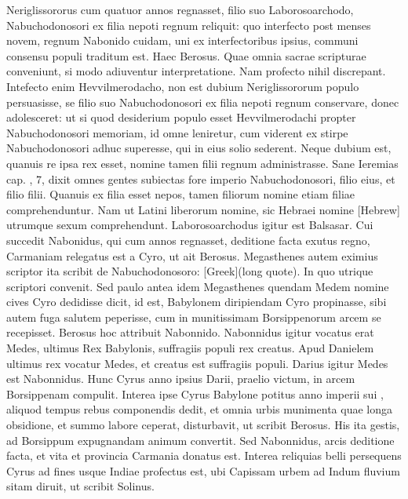 Neriglissororus cum quatuor annos regnasset,
filio suo Laborosoarchodo, Nabuchodonosori ex filia nepoti
regnum reliquit: quo interfecto post menses novem, regnum Nabonido
cuidam, uni ex interfectoribus ipsius, communi consensu
populi traditum est.
Haec Berosus.
Quae omnia sacrae scripturae conveniunt,
si modo adiuventur interpretatione.
Nam profecto nihil
discrepant.
Intefecto enim Hevvilmerodacho, non est dubium
Neriglissororum populo persuasisse, se filio suo Nabuchodonosori
ex filia nepoti regnum conservare, donec adolesceret: ut si quod
desiderium populo esset Hevvilmerodachi propter Nabuchodonosori
memoriam, id omne leniretur, cum viderent ex stirpe Nabuchodonosori
adhuc superesse, qui in eius solio sederent.
Neque dubium est, quanuis re ipsa rex esset, nomine tamen filii regnum
administrasse.
Sane Ieremias cap. , 7, dixit omnes gentes subiectas
fore imperio Nabuchodonosori, filio eius, et filio filii.
Quanuis ex filia esset nepos, tamen filiorum nomine etiam filiae
 comprehenduntur.
Nam ut Latini liberorum nomine, sic Hebraei nomine
\texthebrew{[Hebrew]} utrumque sexum comprehendunt.
Laborosoarchodus igitur
est Balsasar.
Cui succedit Nabonidus, qui cum annos  regnasset,
deditione facta exutus regno, Carmaniam relegatus est a Cyro,
ut ait Berosus.
Megasthenes autem eximius scriptor ita scribit de
Nabuchodonosoro: \textgreek{[Greek](long quote)}.
In
quo utrique scriptori convenit.
Sed paulo antea idem Megasthenes
quendam Medem nomine cives Cyro dedidisse dicit, id est, Babylonem
diripiendam Cyro propinasse, sibi autem fuga salutem peperisse,
cum in munitissimam Borsippenorum arcem se recepisset.
Berosus hoc attribuit Nabonnido.
Nabonnidus igitur vocatus erat
Medes, ultimus Rex Babylonis, suffragiis populi rex creatus.
Apud
Danielem ultimus rex vocatur Medes, et creatus est suffragiis populi.
Darius igitur Medes est Nabonnidus.
Hunc Cyrus anno 
ipsius Darii, praelio victum, in arcem Borsippenam compulit.
Interea ipse Cyrus Babylone potitus anno imperii sui
 , aliquod
tempus rebus componendis dedit, et omnia urbis munimenta
quae longa obsidione, et summo labore ceperat, disturbavit, ut
scribit Berosus.
His ita gestis, ad Borsippum expugnandam animum
convertit.
Sed Nabonnidus, arcis deditione facta, et vita
et provincia Carmania donatus est.
Interea reliquias belli persequens
Cyrus ad fines usque Indiae profectus est, ubi Capissam urbem
ad Indum fluvium sitam diruit, ut scribit Solinus.

